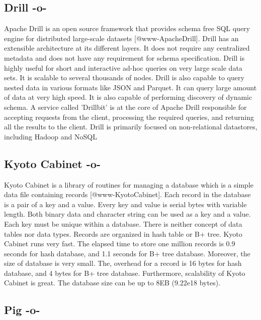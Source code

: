 \subsection{Drill -o-}

Apache Drill is an open source framework that provides schema free SQL
query engine for distributed large-scale
datasets [@www-ApacheDrill]. Drill has an extensible architecture
at its different layers. It does not require any centralized metadata
and does not have any requirement for schema specification. Drill is
highly useful for short and interactive ad-hoc queries on very large
scale data sets. It is scalable to several thousands of nodes. Drill
is also capable to query nested data in various formats like JSON and
Parquet. It can query large amount of data at very high speed. It is
also capable of performing discovery of dynamic schema.  A service
called 'Drillbit' is at the core of Apache Drill responsible for
accepting requests from the client, processing the required queries,
and returning all the results to the client.  Drill is primarily
focused on non-relational datastores, including Hadoop and NoSQL



\subsection{Kyoto Cabinet -o-}

Kyoto Cabinet is a library of routines for managing a database which
is a simple data file containing records [@www-KyotoCabinet].
Each record in the database is a pair of a key and a value. Every key
and value is serial bytes with variable length. Both binary data and
character string can be used as a key and a value. Each key must be
unique within a database.  There is neither concept of data tables nor
data types. Records are organized in hash table or B+ tree. Kyoto
Cabinet runs very fast. The elapsed time to store one million records
is 0.9 seconds for hash database, and 1.1 seconds for B+ tree
database. Moreover, the size of database is very small. The, overhead
for a record is 16 bytes for hash database, and 4 bytes for B+ tree
database. Furthermore, scalability of Kyoto Cabinet is great. The
database size can be up to 8EB (9.22e18 bytes).




\subsection{Pig -o-}



